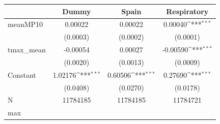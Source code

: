 {
\def\sym#1{\ifmmode^{#1}\else\(^{#1}\)\fi}
\begin{tabular}{l*{3}{c}}
\toprule
            &\multicolumn{1}{c}{Dummy}&\multicolumn{1}{c}{Spain}&\multicolumn{1}{c}{Respiratory}\\
\midrule
meanMP10    &     0.00022         &     0.00022         &     0.00040\sym{***}\\
            &    (0.0003)         &    (0.0002)         &    (0.0001)         \\
tmax\_mean   &    -0.00054         &     0.00027         &    -0.00590\sym{***}\\
            &    (0.0020)         &    (0.0013)         &    (0.0009)         \\
Constant    &     1.02176\sym{***}&     0.60506\sym{***}&     0.27690\sym{***}\\
            &    (0.0408)         &    (0.0270)         &    (0.0178)         \\
\midrule
N           &    11784185         &    11784185         &    11784721         \\
max         &                     &                     &                     \\
\bottomrule
\end{tabular}
}
